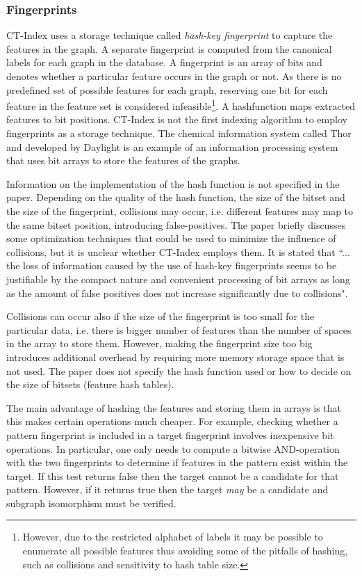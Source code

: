 \documentclass{l4proj}
\newcounter{example}[section]
\begin{document}
\subsubsection{Fingerprints}

CT-Index uses a storage technique called \emph{hash-key fingerprint} to capture the features in the graph. A separate fingerprint is computed from the canonical labels for each graph in the database. A fingerprint is an array of bits and denotes whether a particular feature occurs in the graph or not. As there is no predefined set of possible features for each graph, reserving one bit for each feature in the feature set is considered infeasible\footnote{However, due to the restricted alphabet of labels it may be possible to enumerate all possible features thus avoiding some of the pitfalls of hashing, such as collisions and sensitivity to hash table size.}. A \gls{hashfunction} maps extracted features to bit positions.
CT-Index is not the first indexing algorithm to employ fingerprints as a storage technique. The chemical information system called Thor and developed by Daylight \cite{fingerprints} is an example of an information processing system that uses bit arrays to store the features of the graphs.

Information on the implementation of the hash function is not specified in the paper. Depending on the quality of the hash function, the size of the bitset and the size of the fingerprint, collisions may occur, i.e. different features may map to the same bitset position, introducing false-positives. The \cite{ctindex} paper briefly discusses some optimization techniques that could be used to minimize the influence of collisions, but it is unclear whether CT-Index employs them. 
It is stated that ``... the loss of information caused by the use of hash-key fingerprints seems to be justifiable by the compact nature and convenient processing of bit arrays as long as the amount of false positives does not increase significantly due to collisions".

Collisions can occur also if the size of the fingerprint is too small for the particular data, i.e. there is bigger number of features than the number of spaces in the array to store them. However, making the fingerprint size too big introduces additional overhead by requiring more memory storage space that is not used. The paper does not specify the hash function used or how to decide on the size of bitsets (feature hash tables). 

The main advantage of hashing the features and storing them in arrays is that this makes certain operations much cheaper. For example, checking whether a pattern fingerprint is included in a target fingerprint involves inexpensive bit operations. In particular, one only needs to compute a bitwise AND-operation with the two fingerprints to determine if features in the pattern exist within the target. If this test returns false then the target cannot be a candidate for that pattern. However, if it returns true then the target \emph{may} be a candidate and subgraph isomorphism must be verified.
\end{document}

